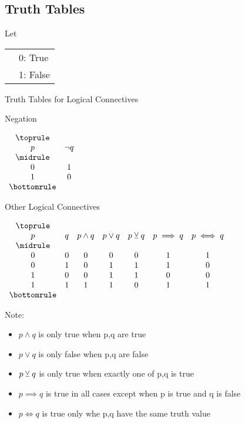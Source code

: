 \documentclass[../../../main.tex]{subfiles}
\begin{document}
\subsection{Truth Tables}

Let

\begin{tabularx}{0.80\linewidth}{@{}lX}
    & 0: True \\
    & 1: False
\end{tabularx}

\begin{table}[!htb]
    \caption{Truth Tables for Logical Connectives}
    \centering
    \begin{subtable}{0.15\linewidth}
        \centering
        \caption{Negation}
        \label{tbl:logical-negation}
        $\begin{array}{ *{2}{c} }
            \toprule \\
            p & \neg q \\
            \midrule \\
            0 & 1 \\
            1 & 0 \\
            \bottomrule
        \end{array}$
    \end{subtable}%
    \begin{subtable}{0.5\linewidth}
        \centering
        \caption{Other Logical Connectives}
        \label{tbl:logic-connectives}
        $\begin{array}{ *{7}{c} }
            \toprule \\
            p & q & p \land q & p \lor q & p \lxor q & p \implies q & p \iff q \\
            \midrule \\
            0 & 0 & 0 & 0 & 0 & 1 & 1 \\
            0 & 1 & 0 & 1 & 1 & 1 & 0 \\
            1 & 0 & 0 & 1 & 1 & 0 & 0 \\
            1 & 1 & 1 & 1 & 0 & 1 & 1 \\
            \bottomrule
        \end{array}$
    \end{subtable}
\end{table}

Note:
\begin{itemize}
    \item $p \land q$ is only true when p,q are true
    \item $p \lor q$ is only false when p,q are false
    \item $p \veebar q$ is only true when exactly one of p,q is true
    \item $p \implies q$ is true in all cases except when p is true and q is false
    \item $p \iff q$ is true only whe p,q have the same truth value
\end{itemize}
\end{document}
